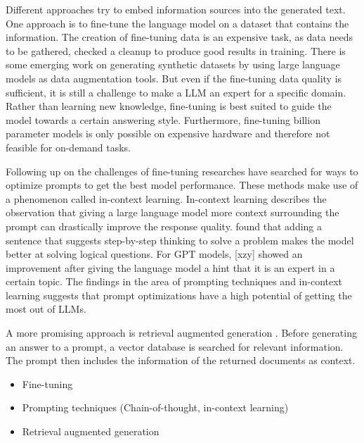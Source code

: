 \documentclass[../../main.tex]{subfiles}
\begin{document}
Different approaches try to embed information sources into the generated text.
One approach is to fine-tune the language model on a dataset that contains the information.
The creation of fine-tuning data is an expensive task, as data needs to be gathered, checked a cleanup to produce good results in training.
There is some emerging work on generating synthetic datasets by using large language models as data augmentation tools.
But even if the fine-tuning data quality is sufficient, it is still a challenge to make a LLM an expert for a specific domain.
Rather than learning new knowledge, fine-tuning is best suited to guide the model towards a certain answering style.
Furthermore, fine-tuning billion parameter models is only possible on expensive hardware and therefore not feasible for on-demand tasks.

Following up on the challenges of fine-tuning researches have searched for ways to optimize prompts to get the best model performance.
These methods make use of a phenomenon called in-context learning.
In-context learning describes the observation that giving a large language model more context surrounding the prompt can drastically improve the response quality.
\cite{Wei2022} found that adding a sentence that suggests step-by-step thinking to solve a problem makes the model better at solving logical questions.
For GPT models, [xzy] showed an improvement after giving the language model a hint that it is an expert in a certain topic.
The findings in the area of prompting techniques and in-context learning suggests that prompt optimizations have a high potential of getting the most out of LLMs.

A more promising approach is retrieval augmented generation \cite{Lewis2020}.
Before generating an answer to a prompt, a vector database is searched for relevant information.
The prompt then includes the information of the returned documents as context.

\begin{itemize}
	\item Fine-tuning
	\item Prompting techniques (Chain-of-thought, in-context learning)
	\item Retrieval augmented generation
\end{itemize}
\end{document}
